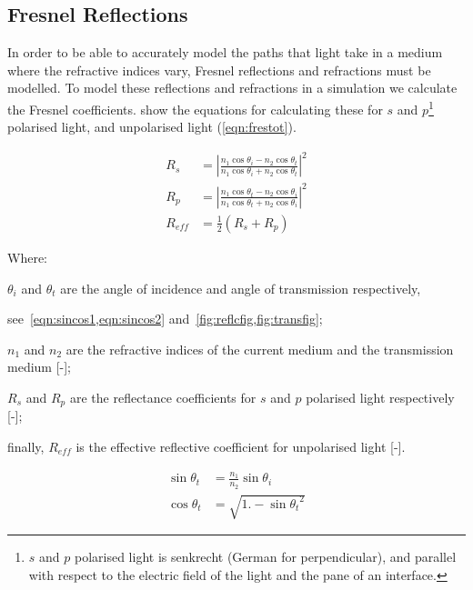 \begin{appendices}

\chapter{Fresnel Reflections}
\label{app:fresnelappend}

In order to be able to accurately model the paths that light take in a medium where the refractive indices vary, Fresnel reflections and refractions must be modelled.
To model these reflections and refractions in a simulation we calculate the Fresnel coefficients.
 show the equations for calculating these for $s$ and $p$\footnote{$s$ and $p$ polarised light is senkrecht (German for perpendicular), and parallel with respect to the electric field of the light and the pane of an interface.} polarised light, and unpolarised light (\cref{eqn:frestot}).


\begin{align}
R_s&=\left|\frac{n_1 \cos\theta_i-n_2\cos\theta_t}{n_1\cos\theta_i+n_2\cos\theta_t}\right|^2\label{eqn:fres1}\\
R_p&=\left|\frac{n_1 \cos\theta_t-n_2\cos\theta_i}{n_1\cos\theta_t+n_2\cos\theta_i}\right|^2\label{eqn:fres2}\\
R_{eff}&=\tfrac{1}{2}\left(R_s+R_p\right)\label{eqn:frestot}
\end{align}

\noindent Where: 

\indent $\theta_i$ and $\theta_t$ are the angle of incidence and angle of transmission respectively,

\indent see~\cref{eqn:sincos1,eqn:sincos2} and~\cref{fig:reflcfig,fig:transfig};

\indent $n_1$ and $n_2$ are the refractive indices of the current medium and the transmission medium [-];

\indent $R_s$ and $R_p$ are the reflectance coefficients for $s$ and $p$ polarised light respectively [-];

\indent finally, $R_{eff}$ is the effective reflective coefficient for unpolarised light [-].

\medskip

\begin{align}
\sin\theta_t&=\frac{n_1}{n_2}\sin\theta_i\label{eqn:sincos1}\\
\cos\theta_t&=\sqrt{1. - {\sin\theta_t}^2}\label{eqn:sincos2}
\end{align}


\end{appendices}
